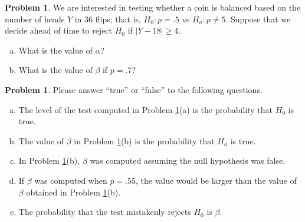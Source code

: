 \documentclass[10pt]{article}
\theoremstyle{definition}
\newtheorem{problem}[theorem]{Problem}
\newcommand{\1}[1]{\textbf{1}_{\left[#1\right]}} %
\begin{document}



\begin{problem}
  \label{problem:exercise-10.6}
  We are interested in testing whether a coin is balanced based on the number
  of heads $Y$ in 36 flips; that is, $H_{0}:p=.5$ vs $H_{a}:p\neq 5$. Suppose
  that we decide ahead of time to reject $H_{0}$ if $\left| Y-18 \right| \geq 4$.
  \begin{enumerate}[(a)]
    \item What is the value of $\alpha$?
    \item What is the value of $\beta$ if $p=.7$?
  \end{enumerate}
\end{problem}


\begin{problem}
  Please answer ``true'' or ``false'' to the following questions.
  \begin{enumerate}[(a)]
    \item The level of the test computed in Problem \ref{problem:exercise-10.6}(a) is
    the probability that $H_{0}$ is true.
    \item The value of $\beta$ in Problem \ref{problem:exercise-10.6}(b) is the
    probability that $H_{a}$ is true.
    \item In Problem \ref{problem:exercise-10.6}(b), $\beta$ was computed assuming
    the null hypothesis was false.
    \item If $\beta$ was computed when $p=.55$, the value would be larger than
    the value of $\beta$ obtained in Problem \ref{problem:exercise-10.6}(b).
    \item The probability that the test mistakenly rejects $H_{0}$ is $\beta$. 
  \end{enumerate}
\end{problem}
\end{document}
